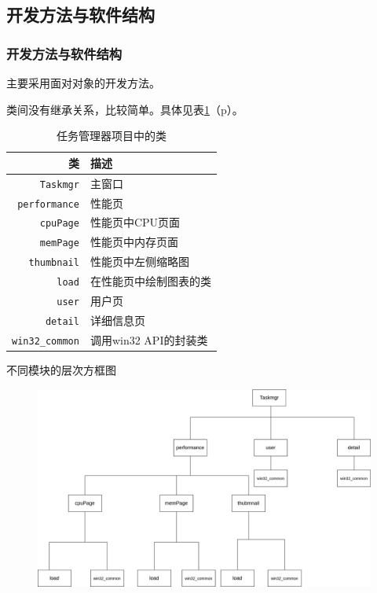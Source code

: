 \documentclass{beamer}
\newcommand\code[1]{\texttt{#1}}
\newcommand\myref[1]{\ref{#1}（p\pageref{#1}）}
\begin{document}
\subsection{开发方法与软件结构}
\begin{frame}
    \frametitle{开发方法与软件结构}
    主要采用面对对象的开发方法。

类间没有继承关系，比较简单。具体见表\myref{table:classes}。
\begin{table}[htb]
    \centering
    \begin{tabular}{rl}
        \hline
        类 & 描述 \\
        \hline
        \code{Taskmgr} & 主窗口 \\
        \code{performance} & 性能页 \\
        \code{cpuPage} & 性能页中CPU页面 \\
        \code{memPage} & 性能页中内存页面 \\
        \code{thumbnail} & 性能页中左侧缩略图 \\
        \code{load} & 在性能页中绘制图表的类 \\
        \code{user} & 用户页 \\
        \code{detail} & 详细信息页 \\
        \code{win32\_common} & 调用win32 API的封装类 \\
        \hline
    \end{tabular}
    \caption{任务管理器项目中的类}
    \label{table:classes}
\end{table}
\end{frame}

\begin{frame}
    不同模块的层次方框图
    \begin{figure}
        \centering
        \includegraphics[scale=0.23]{../dia/层次方框图.png}
    \end{figure}
\end{frame}
\end{document}
